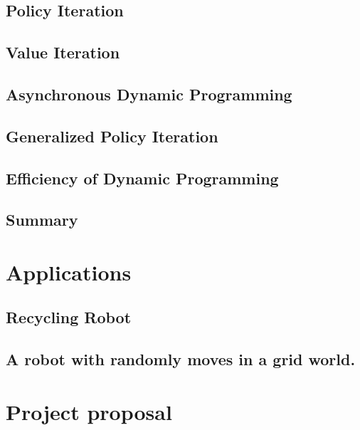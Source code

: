 \documentclass[
  letterpaper,
  DIV=11,
  numbers=noendperiod]{scrreprt}
\theoremstyle{definition}
\theoremstyle{remark}
\begin{document}
\section{Policy Iteration}\label{policy-iteration}

\section{Value Iteration}\label{value-iteration}

\section{Asynchronous Dynamic
Programming}\label{asynchronous-dynamic-programming}

\section{Generalized Policy
Iteration}\label{generalized-policy-iteration}

\section{Efficiency of Dynamic
Programming}\label{efficiency-of-dynamic-programming}

\section{Summary}\label{summary-1}


\chapter{Applications}\label{applications}

\section{Recycling Robot}\label{recycling-robot}

\section{A robot with randomly moves in a grid
world.}\label{a-robot-with-randomly-moves-in-a-grid-world.}


\chapter{Project proposal}\label{project-proposal}
\end{document}
